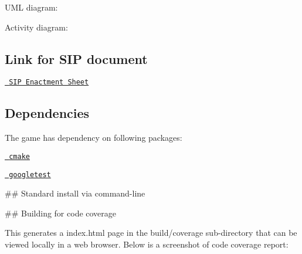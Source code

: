 \begin{DoxyEnumerate}
\item U\+ML diagram\+:
\end{DoxyEnumerate}

 


\begin{DoxyEnumerate}
\item Activity diagram\+:
\end{DoxyEnumerate}

 

\subsection*{Link for S\+IP document}

\href{https://docs.google.com/spreadsheets/d/1osaNjtBZ5rFgGtWi5gnai63RkGZE8U25gTj9zXKbLFg/edit#gid=0}\texttt{ S\+IP Enactment Sheet}

\subsection*{Dependencies}

The game has dependency on following packages\+:
\begin{DoxyEnumerate}
\item \href{https://cmake.org/}\texttt{ cmake}
\item \href{https://github.com/google/googletest}\texttt{ googletest}
\end{DoxyEnumerate}

\#\# Standard install via command-\/line 
\begin{DoxyCode}{0}
\end{DoxyCode}


\#\# Building for code coverage 
\begin{DoxyCode}{0}
\end{DoxyCode}
 This generates a index.\+html page in the build/coverage sub-\/directory that can be viewed locally in a web browser. Below is a screenshot of code coverage report\+: 

